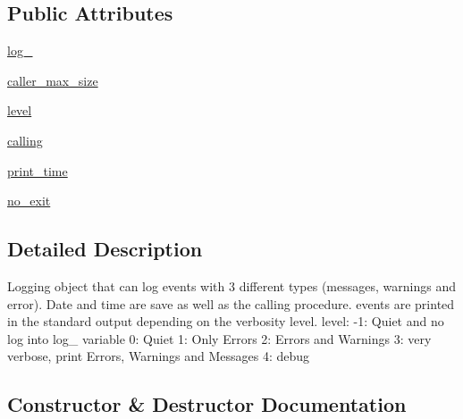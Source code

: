 \subsection*{Public Attributes}
\begin{DoxyCompactItemize}
\item 
\hyperlink{classpyneb_1_1utils_1_1logging_1_1my__logging_afd87151907f32bc0dc45f0171b61374e}{log\+\_\+}
\item 
\hyperlink{classpyneb_1_1utils_1_1logging_1_1my__logging_a1600d67de9d1d8f8c7036bd6909f9834}{caller\+\_\+max\+\_\+size}
\item 
\hyperlink{classpyneb_1_1utils_1_1logging_1_1my__logging_afde8e18a788ccc92fc61cab298bca7e3}{level}
\item 
\hyperlink{classpyneb_1_1utils_1_1logging_1_1my__logging_ab25fa7ebe84b603684dee62410c1e34c}{calling}
\item 
\hyperlink{classpyneb_1_1utils_1_1logging_1_1my__logging_a64ce0c908aacc650546490cf9750da97}{print\+\_\+time}
\item 
\hyperlink{classpyneb_1_1utils_1_1logging_1_1my__logging_a13a9674c8ab620cbbedd3939f475965a}{no\+\_\+exit}
\end{DoxyCompactItemize}


\subsection{Detailed Description}
\begin{DoxyVerb}Logging object that can log events with 3 different types (messages, warnings and error).
Date and time are save as well as the calling procedure.
events are printed in the standard output depending on the verbosity level.
level: -1: Quiet and no log into log_ variable
         0: Quiet
         1: Only Errors
         2: Errors and Warnings
         3: very verbose, print Errors, Warnings and Messages 
         4: debug\end{DoxyVerb}
 

\subsection{Constructor \& Destructor Documentation}
\hypertarget{classpyneb_1_1utils_1_1logging_1_1my__logging_ac775ee34451fdfa742b318538164070e}{}
